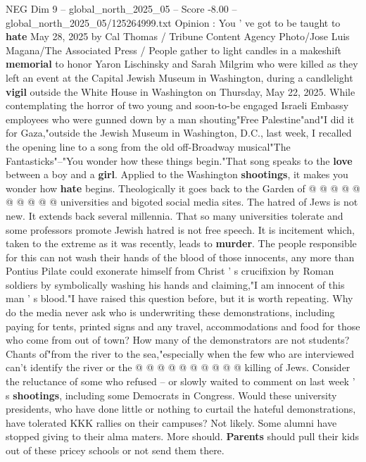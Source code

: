 \begin{textsample}{NEG Dim 9 – global\_north\_2025\_05 – Score -8.00 – global\_north\_2025\_05/125264999.txt}  \label{ex:f9_neg_171}
Opinion : You ' ve got to be taught to \textbf{hate} May 28, 2025 by Cal Thomas / Tribune Content Agency Photo/Jose Luis Magana/The Associated Press / People gather to light candles in a makeshift \textbf{memorial} to honor Yaron Lischinsky and Sarah Milgrim who were killed as they left an event at the Capital Jewish Museum in Washington, during a candlelight \textbf{vigil} outside the White House in Washington on Thursday, May 22, 2025.
While contemplating the horror of two young and soon-to-be engaged Israeli Embassy employees who were gunned down by a man shouting"Free Palestine"and"I did it for Gaza,"outside the Jewish Museum in Washington, D.C., last week, I recalled the opening line to a song from the old off-Broadway musical"The Fantasticks"--"You wonder how these things begin."That song speaks to the \textbf{love} between a boy and a \textbf{girl}.
Applied to the Washington \textbf{shootings}, it makes you wonder how \textbf{hate} begins.
Theologically it goes back to the Garden of @ @ @ @ @ @ @ @ @ @ universities and bigoted social media sites.
The hatred of Jews is not new.
It extends back several millennia.
That so many universities tolerate and some professors promote Jewish hatred is not free speech.
It is incitement which, taken to the extreme as it was recently, leads to \textbf{murder}.
The people responsible for this can not wash their hands of the blood of those innocents, any more than Pontius Pilate could exonerate himself from Christ ' s crucifixion by Roman soldiers by symbolically washing his hands and claiming,"I am innocent of this man ' s blood."I have raised this question before, but it is worth repeating.
Why do the media never ask who is underwriting these demonstrations, including paying for tents, printed signs and any travel, accommodations and food for those who come from out of town?
How many of the demonstrators are not students?
Chants of"from the river to the sea,"especially when the few who are interviewed can't identify the river or the @ @ @ @ @ @ @ @ @ @ killing of Jews.
Consider the reluctance of some who refused -- or slowly waited to comment on last week ' s \textbf{shootings}, including some Democrats in Congress.
Would these university presidents, who have done little or nothing to curtail the hateful demonstrations, have tolerated KKK rallies on their campuses?
Not likely.
Some alumni have stopped giving to their alma maters.
More should. \textbf{Parents} should pull their kids out of these pricey schools or not send them there.

\end{textsample}

